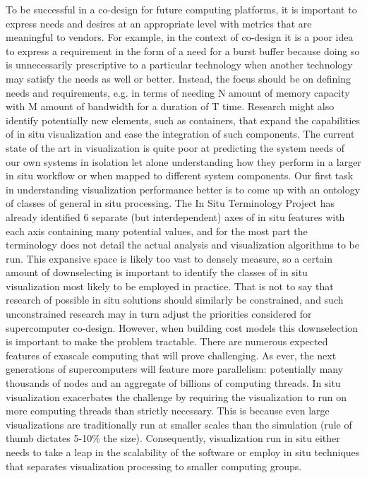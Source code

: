 \begin{refsection}
To be successful in a co-design for future computing platforms, it is important to express needs and desires at an appropriate level with metrics that are meaningful to vendors. For example, in the context of co-design it is a poor idea to express a requirement in the form of a need for a burst buffer because doing so is unnecessarily prescriptive to a particular technology when another technology may satisfy the needs as well or better. Instead, the focus should be on defining needs and requirements, e.g. in terms of needing N amount of memory capacity with M amount of bandwidth for a duration of T time. Research might also identify potentially new elements, such as containers, that expand the capabilities of in situ visualization and ease the integration of such components.
The current state of the art in visualization is quite poor at predicting the system needs of our own systems in isolation let alone understanding how they perform in a larger in situ workflow or when mapped to different system components. Our first task in understanding visualization performance better is to come up with an ontology of classes of general in situ processing. The In Situ Terminology Project has already identified 6 separate (but interdependent) axes of in situ features with each axis containing many potential values, and for the most part the terminology does not detail the actual analysis and visualization algorithms to be run. This expansive space is likely too vast to densely measure, so a certain amount of downselecting is important to identify the classes of in situ visualization most likely to be employed in practice. That is not to say that research of possible in situ solutions should similarly be constrained, and such unconstrained research may in turn adjust the priorities considered for supercomputer co-design. However, when building cost models this downselection is important to make the problem tractable.
There are numerous expected features of exascale computing that will prove challenging. As ever, the next generations of supercomputers will feature more parallelism: potentially many thousands of nodes and an aggregate of billions of computing threads. In situ visualization exacerbates the challenge by requiring the visualization to run on more computing threads than strictly necessary. This is because even large visualizations are traditionally run at smaller scales than the simulation (rule of thumb dictates 5-10\% the size). Consequently, visualization run in situ either needs to take a leap in the scalability of the software or employ in situ techniques that separates visualization processing to smaller computing groups.

\end{refsection}
